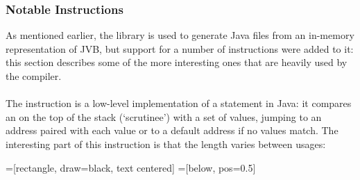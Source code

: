 \documentclass[dissertation.tex]{subfiles}
\begin{document}
{{{\begin{itemize}
{            }
            \end{itemize}

        }
        \subsubsection{Notable Instructions}
        {

            As mentioned earlier, the  library is used to generate Java  files from
            an in-memory representation of JVB, but support for a number of instructions were added to it: this section
            describes some of the more interesting ones that are heavily used by the compiler.
            
            \paragraph*{}
            {
                
                The  instruction is a low-level implementation of a  statement in
                Java: it compares an  on the top of the stack (`scrutinee') with a set of values, jumping to
                an address paired with each value or to a default address if no values match. The interesting part of
                this instruction is that the length varies between usages:

                =[rectangle, draw=black, text centered]
                =[below, pos=0.5]

                \begin{figure}[h]
\end{figure}}}}}
\end{document}
